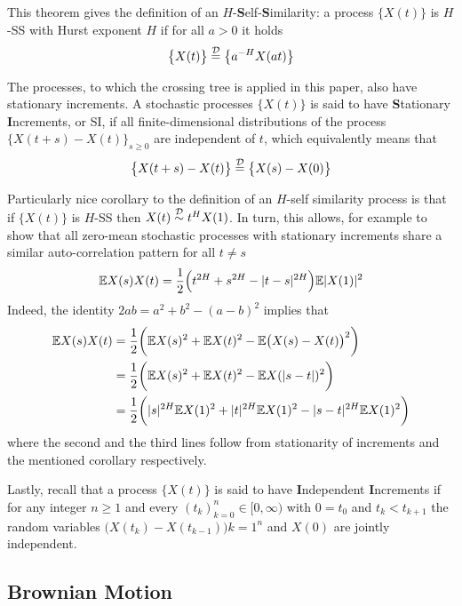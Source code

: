This theorem gives the definition of an $H$-\textbf{S}elf-\textbf{S}imilarity: a process
$\bigl\{X(t)\bigr\}$ is $H$-SS with Hurst exponent $H$ if for all $a>0$ it holds
\[ \bigl\{X(t)\bigr\} \overset{\mathcal{D}}{=} \bigl\{a^{-H} X(at)\bigr\} \]

The processes, to which the crossing tree is applied in this paper, also have stationary
increments. A stochastic processes $\bigl\{X(t)\bigr\}$ is said to have \textbf{S}tationary
\textbf{I}ncrements, or SI, if all finite-dimensional distributions of the process
$\bigl\{X(t+s) - X(t)\bigr\}_{s\geq0}$ are independent of $t$, which equivalently means
that
\[ \bigl\{X(t+s)-X(t)\bigr\} \overset{\mathcal{D}}{=} \bigl\{X(s)-X(0)\bigr\} \]

Particularly nice corollary to the definition of an $H$-self similarity process is that
if $\bigl\{X(t)\bigr\}$ is $H$-SS then $X(t)\overset{\mathcal{D}}{\sim}t^H X(1)$. In turn,
this allows, for example to show that all zero-mean stochastic processes with stationary
increments share a similar auto-correlation pattern for all $t\neq s$
\[ \mathbb{E} X(s) X(t) = \frac{1}{2}\Bigl( t^{2H} + s^{2H} - |t-s|^{2H}\Bigr) \mathbb{E}|X(1)|^2 \]
Indeed, the identity $2 a b = a^2 + b^2 - (a-b)^2$ implies that\begin{align*}
	\mathbb{E} X(s) X(t)
	&= \frac{1}{2}\biggl( \mathbb{E} X(s)^2 + \mathbb{E} X(t)^2 - \mathbb{E}\bigl( X(s) - X(t) \bigr)^2 \biggr) \\
	&= \frac{1}{2}\biggl( \mathbb{E} X(s)^2 + \mathbb{E} X(t)^2 - \mathbb{E} X(|s-t|)^2 \biggr) \\
	&= \frac{1}{2}\biggl( |s|^{2H} \mathbb{E} X(1)^2 + |t|^{2H} \mathbb{E} X(1)^2 - |s-t|^{2H} \mathbb{E} X(1)^2 \biggr)
\end{align*}
where the second and the third lines follow from stationarity of increments and the
mentioned corollary respectively.

Lastly, recall that a process $\bigl\{X(t)\bigr\}$ is said to have \textbf{I}ndependent
\textbf{I}ncrements if for any integer $n\geq1$ and every $(t_k)_{k=0}^n\in[0,\infty)$
with $0=t_0$ and $t_k < t_{k+1}$ the random variables $\bigl(X(t_k) - X(t_{k-1})\bigr){k=1}^n$
and $X(0)$ are jointly independent.


\subsection{Brownian Motion} %
\label{sub:brownian_motion}

